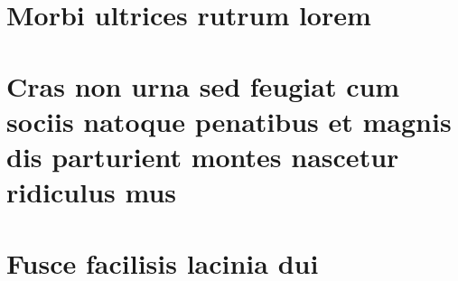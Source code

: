 \begin{anexosenv}

    \newpage
    
    
    \chapter{Morbi ultrices rutrum lorem}
    \lipsum[30]

    \chapter{Cras non urna sed feugiat cum sociis natoque penatibus et magnis dis
    parturient montes nascetur ridiculus mus}
    \lipsum[31]

    \chapter{Fusce facilisis lacinia dui}
    \lipsum[32]
    
\end{anexosenv}